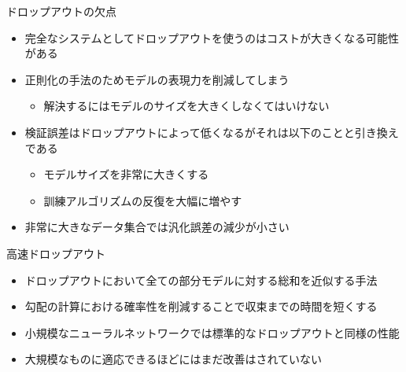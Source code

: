 \documentclass[dvipdfmx, 10pt]{beamer}
\begin{document}

\begin{frame}{ドロップアウトの欠点}
  \begin{itemize}
    \item 完全なシステムとしてドロップアウトを使うのはコストが大きくなる可能性がある
    \item 正則化の手法のためモデルの表現力を削減してしまう
    \begin{itemize}
      \item 解決するにはモデルのサイズを大きくしなくてはいけない
    \end{itemize}
    \item 検証誤差はドロップアウトによって低くなるがそれは以下のことと引き換えである
    \begin{itemize}
      \item モデルサイズを非常に大きくする
      \item 訓練アルゴリズムの反復を大幅に増やす
    \end{itemize}
    \item 非常に大きなデータ集合では汎化誤差の減少が小さい
  \end{itemize}
\end{frame}


\begin{frame}{高速ドロップアウト}
  \begin{itemize}
    \item ドロップアウトにおいて全ての部分モデルに対する総和を近似する手法
    \item 勾配の計算における確率性を削減することで収束までの時間を短くする
    \item 小規模なニューラルネットワークでは標準的なドロップアウトと同様の性能
    \item 大規模なものに適応できるほどにはまだ改善はされていない
  \end{itemize}
\end{frame}

\end{document}
